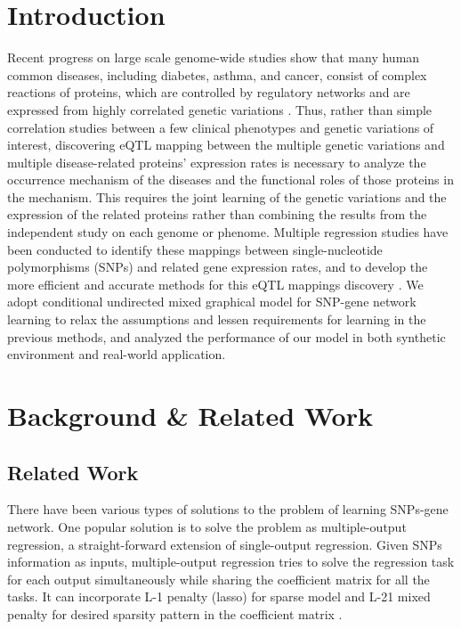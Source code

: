 \documentclass{article}
\begin{document}
\section{Introduction}
Recent progress on large scale genome-wide studies show that many human common diseases, including diabetes, asthma, and cancer, consist of complex reactions of proteins, which are controlled by regulatory networks and are expressed from highly correlated genetic variations \cite{basso2005reverse, chen2008variations}. Thus, rather than simple correlation studies between a few clinical phenotypes and genetic variations of interest, discovering eQTL mapping between the multiple genetic variations and multiple disease-related proteins' expression rates is necessary to analyze the occurrence mechanism of the diseases and the functional roles of those proteins in the mechanism. This requires the joint learning of the genetic variations and the expression of the related proteins rather than combining the results from the independent study on each genome or phenome. Multiple regression studies have been conducted to identify these mappings between single-nucleotide polymorphisms (SNPs) and related gene expression rates, and to develop the more efficient and accurate methods for this eQTL mappings discovery \cite{kim2010tree, sohn2012joint}. We adopt conditional undirected mixed graphical model \cite{lee2013structure} for SNP-gene network learning to relax the assumptions and lessen requirements for learning in the previous methods, and analyzed the performance of our model in both synthetic environment and real-world application.




\section{Background \& Related Work}
\label{LiteratureReview}


\subsection{Related Work}
There have been various types of solutions to the problem of learning SNPs-gene network. One popular solution is to solve the problem as multiple-output regression, a straight-forward extension of single-output regression. 
Given SNPs information as inputs, multiple-output regression tries to solve the regression task for each output simultaneously while sharing the coefficient matrix for all the tasks. It can incorporate L-1 penalty (lasso) for sparse model and L-21 mixed penalty for desired sparsity pattern in the coefficient matrix \cite{obozinski2008high}.
\end{document}
